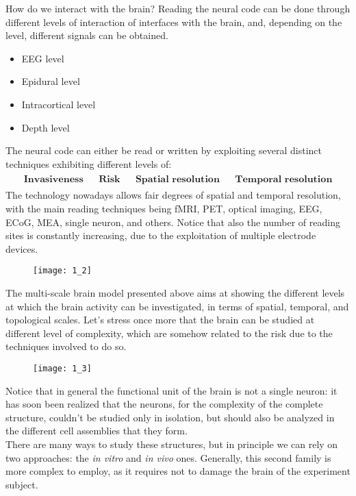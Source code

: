 How do we interact with the brain?
Reading the neural code can be done through different levels of 
interaction of interfaces with the brain, and, depending on the level, 
different signals can be obtained. 
\begin{itemize}
    \item EEG level
    \item Epidural level
    \item Intracortical level
    \item Depth level
\end{itemize}
The neural code can either be read or written by exploiting several 
distinct techniques exhibiting different levels of:
\begin{align*}
    \begin{matrix}
        \textbf{Invasiveness}       &  & \textbf{Risk}                &  &
        \textbf{Spatial resolution} &  & \textbf{Temporal resolution}
    \end{matrix}
\end{align*}
The technology nowadays allows fair degrees of spatial and temporal 
resolution, with
the main reading techniques being fMRI, PET, optical imaging, EEG, ECoG, 
MEA, single neuron, and others. Notice that also the number of reading 
sites is constantly increasing, due to the
exploitation of multiple electrode devices.
\begin{figure}[H]
    \texttt{[image: 1\_2]}
    \centering
\end{figure}
The multi-scale brain model presented above aims at showing the different 
levels at which the brain activity can be investigated, in terms of 
spatial, temporal, and topological scales.
Let's stress once more that the brain can be studied at different level of 
complexity, which are somehow related to the risk due to the techniques 
involved to do so.
\begin{figure}[H]
    \texttt{[image: 1\_3]}
    \centering
\end{figure}
Notice that in general the functional unit of the brain is not a single 
neuron: it has soon been realized that the neurons, for the complexity of 
the complete structure, couldn't be studied only in isolation, but should 
also be analyzed in the different cell assemblies that they form.\\
There are many ways to study these structures, but in principle we can 
rely on two approaches: the \textit{in vitro} and \textit{in vivo} ones. 
Generally, this second family is more complex to employ, as it requires 
not to damage the brain of
the experiment subject. 

